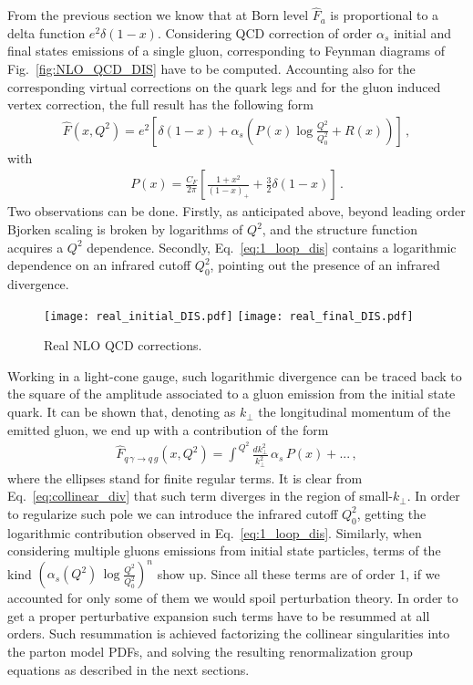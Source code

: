 %
From the previous section we know that at Born level $\hat{F}_a$ is proportional
to a delta function $e^2\delta\left(1-x\right)$. 
Considering QCD correction of order $\alpha_s$
initial and final states emissions of a single gluon, corresponding to Feynman diagrams of Fig.~\eqref{fig:NLO_QCD_DIS}
have to be computed. 
Accounting also for the corresponding virtual corrections on the quark legs
and for the gluon induced vertex correction, the full result has the following form
\begin{align}
    \label{eq:1_loop_dis}
    \hat{F}\left(x,Q^2\right) = e^2\left[\delta\left(1-x\right) 
    + \alpha_s\left(P\left(x\right)\log\frac{Q^2}{Q_0^2} + R\left(x\right) \right)  \right]\,,
\end{align}
with
\begin{align}
    \label{eq:splitting_function}
    P\left(x\right) = \frac{C_F}{2\pi}\left[\frac{1+x^2}{\left(1-x\right)_+} + \frac{3}{2}\delta\left(1-x\right)\right]\,.
\end{align}
Two observations can be done. Firstly, as anticipated above, beyond leading order
Bjorken scaling is broken by logarithms of $Q^2$, and the structure function acquires a $Q^2$ dependence.
Secondly, Eq.~\eqref{eq:1_loop_dis} contains a logarithmic dependence on an infrared cutoff $Q_0^2$, pointing out 
the presence of an infrared divergence.
\begin{figure}[h]
    \centering
    \texttt{[image: real\_initial\_DIS.pdf]}
    \texttt{[image: real\_final\_DIS.pdf]}
    \caption{Real NLO QCD corrections.}
    \label{fig:NLO_QCD_DIS}
\end{figure}

%
Working in a light-cone gauge, such logarithmic divergence can be traced back to the square of the amplitude associated
to a gluon emission from the initial state quark.
It can be shown that, denoting as $k_{\perp}$ the longitudinal momentum of the emitted gluon,
we end up with a contribution of the form
\begin{align}
    \label{eq:collinear_div}
    \hat{F}_{q\, \gamma \rightarrow q\,g}\left(x,Q^2\right) =
    \int^{\,Q^2}\frac{dk_{\perp}^2}{k_{\perp}^2}\, \alpha_s\, P\left(x\right) + ...\,,
\end{align}
where the ellipses stand for finite regular terms.
It is clear from Eq.~\eqref{eq:collinear_div} that such term diverges in the region of small-$k_{\perp}$.
In order to regularize such pole we can introduce the infrared cutoff $Q_0^2$, getting the logarithmic 
contribution observed in Eq.~\eqref{eq:1_loop_dis}.
Similarly, when considering multiple gluons emissions from initial state particles, terms of the kind 
$\left(\alpha_s\left(Q^2\right)\,\log\frac{Q^2}{Q_0^2}\right)^n$ show up.
Since all these terms are of order 1, if we accounted for only some of them we would spoil perturbation theory.
In order to get a proper perturbative expansion such terms have to be resummed at all orders.
Such resummation is achieved factorizing the collinear singularities into the parton model PDFs,
and solving the resulting renormalization group equations as described in the next sections.

